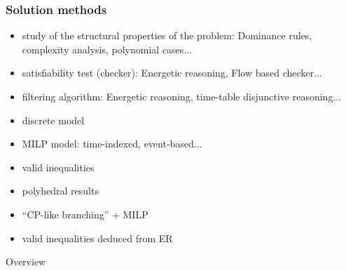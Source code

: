  \begin{frame}
   \frametitle{Solution methods}
   \vfill
   \begin{description}[Properties]
   \item[Properties] {\small
       \begin{itemize}
       \item study of the structural properties of the problem:
         {\footnotesize Dominance rules, complexity analysis, polynomial cases...}
       \end{itemize}}
     \vfill
   \item[CP] {\small
       \begin{itemize}
       \item satisfiability test (checker): {\footnotesize Energetic
           reasoning, Flow based checker...}
       \item filtering algorithm: {\footnotesize Energetic reasoning, time-table
           disjunctive reasoning...}
       \item discrete model
       \end{itemize}}
     \vfill
   \item[MILP] {\small
       \begin{itemize}
       \item MILP model: {\footnotesize time-indexed, event-based...}
       \item valid inequalities
       \item polyhedral results
       \end{itemize}}
     \vfill
   \item[Hybrid] {\small
       \begin{itemize}
       \item ``CP-like branching'' + MILP 
       \item valid inequalities deduced from ER
       \end{itemize}}
   \end{description}
 \end{frame}

 \setcounter{tocdepth}{20}
 \begin{frame}{Overview}
   \tableofcontents[hideothersubsections,subsubsectionstyle={show/show/show/show}]
 \end{frame}
